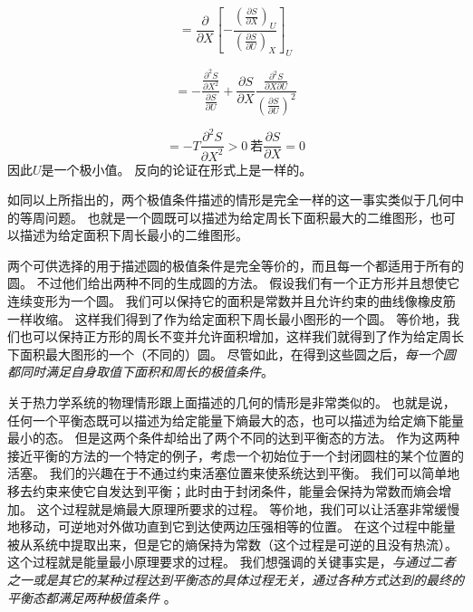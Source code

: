 \begin{equation}
\label{equ5.5}
=\frac{\partial}{\partial X}
\left[-\frac{\left(\frac{\partial S}{\partial X}\right)_U}{\left(\frac{\partial S}{\partial U}\right)_X}\right]_U
\end{equation}

\begin{equation}
\label{equ5.6}
=-\frac{\frac{\partial^2S}{\partial X^2}}
{\frac{\partial S}{\partial U}}+\frac{\partial S}{\partial X}
\frac{\frac{\partial^2S}{\partial X\partial U}}{\left(\frac{\partial S}{\partial U}\right)^2}
\end{equation}

\begin{equation}
\label{equ5.7}
=-T\frac{\partial^2S}{\partial X^2}>0
~\text{若}\frac{\partial S}{\partial X}=0
\end{equation}
因此$U$是一个极小值。
反向的论证在形式上是一样的。

如同以上所指出的，两个极值条件描述的情形是完全一样的这一事实类似于几何中的等周问题。
也就是一个圆既可以描述为给定周长下面积最大的二维图形，也可以描述为给定面积下周长最小的二维图形。


两个可供选择的用于描述圆的极值条件是完全等价的，而且每一个都适用于所有的圆。
不过他们给出两种不同的生成圆的方法。
假设我们有一个正方形并且想使它连续变形为一个圆。
我们可以保持它的面积是常数并且允许约束的曲线像橡皮筋一样收缩。
这样我们得到了作为给定面积下周长最小图形的一个圆。
等价地，我们也可以保持正方形的周长不变并允许面积增加，这样我们就得到了作为给定周长下面积最大图形的一个（不同的）圆。
尽管如此，在得到这些圆之后，{\it 每一个圆都同时满足自身取值下面积和周长的极值条件}。

关于热力学系统的物理情形跟上面描述的几何的情形是非常类似的。
也就是说，任何一个平衡态既可以描述为给定能量下熵最大的态，也可以描述为给定熵下能量最小的态。
但是这两个条件却给出了两个不同的达到平衡态的方法。
作为这两种接近平衡的方法的一个特定的例子，考虑一个初始位于一个封闭圆柱的某个位置的活塞。
我们的兴趣在于不通过约束活塞位置来使系统达到平衡。
我们可以简单地移去约束来使它自发达到平衡；此时由于封闭条件，能量会保持为常数而熵会增加。
这个过程就是熵最大原理所要求的过程。
等价地，我们可以让活塞非常缓慢地移动，可逆地对外做功直到它到达使两边压强相等的位置。
在这个过程中能量被从系统中提取出来，但是它的熵保持为常数（这个过程是可逆的且没有热流）。
这个过程就是能量最小原理要求的过程。
我们想强调的关键事实是，{\it 与通过二者之一或是其它的某种过程达到平衡态的具体过程无关，通过各种方式达到的最终的平衡态都满足两种极值条件}%
%
。

